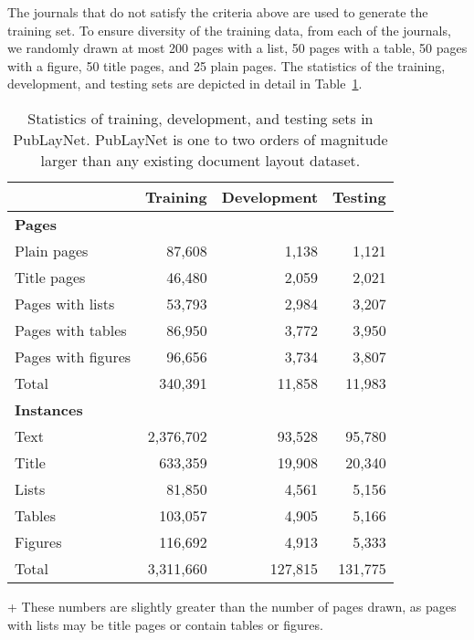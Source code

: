 \documentclass[conference]{IEEEtran}
\begin{document}
The journals that do not satisfy the criteria above are used to generate the training set. To ensure diversity of the training data, from each of the journals, we randomly drawn at most 200 pages with a list, 50 pages with a table, 50 pages with a figure, 50 title pages, and 25 plain pages. The statistics of the training, development, and testing sets are depicted in detail in Table~\ref{tab:partition}.
\begin{table}[!htb]
  \caption{Statistics of training, development, and testing sets in PubLayNet. PubLayNet is one to two orders of magnitude larger than any existing document layout dataset.}
  \label{tab:partition}
  \centering
  \begin{threeparttable}
  \begin{tabular}{p{3cm}rrr}
    \toprule
    & Training & Development & Testing \\
    \midrule
    \textbf{Pages} & & & \\
    Plain pages & 87,608 & 1,138 & 1,121 \\
    Title pages & 46,480 & 2,059\tnote{+} & 2,021\tnote{+} \\
    Pages with lists & 53,793 & 2,984 & 3,207 \\
    Pages with tables & 86,950 & 3,772\tnote{+} & 3,950\tnote{+} \\
    Pages with figures & 96,656 & 3,734\tnote{+} & 3,807\tnote{+} \\
    Total & 340,391 & 11,858 & 11,983 \\
    \midrule
    \textbf{Instances} & & & \\
    Text & 2,376,702 & 93,528 & 95,780 \\
    Title & 633,359 & 19,908 & 20,340\\
    Lists & 81,850 & 4,561 & 5,156 \\
    Tables & 103,057 & 4,905 & 5,166 \\
    Figures & 116,692 & 4,913 & 5,333 \\
    Total & 3,311,660 & 127,815 & 131,775\\
    \bottomrule
\end{tabular}
\begin{tablenotes}\footnotesize
\item[+] These numbers are slightly greater than the number of pages drawn, as pages with lists may be title pages or contain tables or figures.
\end{tablenotes}
\end{threeparttable}
\end{table}
\end{document}

